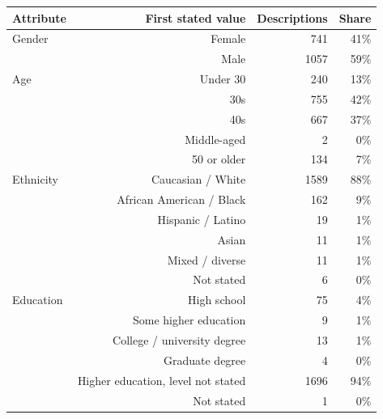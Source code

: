 \begin{tabular}{lrrr}
\toprule
Attribute & First stated value & Descriptions & Share \\
\midrule
Gender & Female & 741 & 41\% \\
 & Male & 1057 & 59\% \\
Age & Under 30 & 240 & 13\% \\
 & 30s & 755 & 42\% \\
 & 40s & 667 & 37\% \\
 & Middle-aged & 2 & 0\% \\
 & 50 or older & 134 & 7\% \\
Ethnicity & Caucasian / White & 1589 & 88\% \\
 & African American / Black & 162 & 9\% \\
 & Hispanic / Latino & 19 & 1\% \\
 & Asian & 11 & 1\% \\
 & Mixed / diverse & 11 & 1\% \\
 & Not stated & 6 & 0\% \\
Education & High school & 75 & 4\% \\
 & Some higher education & 9 & 1\% \\
 & College / university degree & 13 & 1\% \\
 & Graduate degree & 4 & 0\% \\
 & Higher education, level not stated & 1696 & 94\% \\
 & Not stated & 1 & 0\% \\
\bottomrule
\end{tabular}
